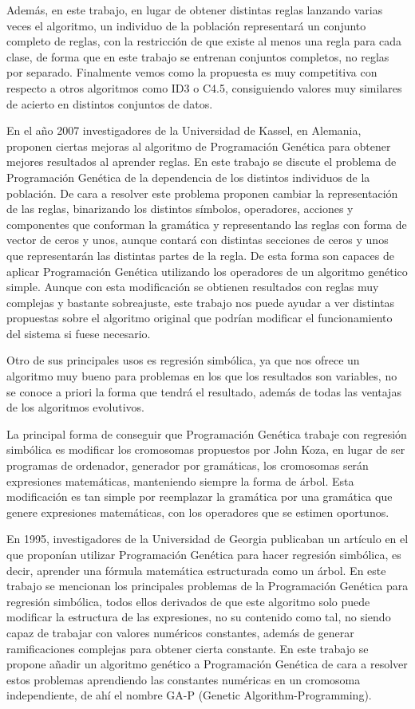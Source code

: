 Además, en este trabajo, en lugar de obtener distintas reglas lanzando varias veces el algoritmo, un individuo de la población representará un conjunto completo de reglas, con la restricción de que existe al menos una regla para cada clase, de forma que en este trabajo se entrenan conjuntos completos, no reglas por separado. Finalmente vemos como la propuesta es muy competitiva con respecto a otros algoritmos como ID3 o C4.5, consiguiendo valores muy similares de acierto en distintos conjuntos de datos.

En el año 2007 investigadores de la Universidad de Kassel, en Alemania, proponen \cite{mejorasPGreglas} ciertas mejoras al algoritmo de Programación Genética para obtener mejores resultados al aprender reglas. En este trabajo se discute el problema de Programación Genética de la dependencia de los distintos individuos de la población. De cara a resolver este problema proponen cambiar la representación de las reglas, binarizando los distintos símbolos, operadores, acciones y componentes que conforman la gramática y representando las reglas con forma de vector de ceros y unos, aunque contará con distintas secciones de ceros y unos que representarán las distintas partes de la regla. De esta forma son capaces de aplicar Programación Genética utilizando los operadores de un algoritmo genético simple. Aunque con esta modificación se obtienen resultados con reglas muy complejas y bastante sobreajuste, este trabajo nos puede ayudar a ver distintas propuestas sobre el algoritmo original que podrían modificar el funcionamiento del sistema si fuese necesario.

Otro de sus principales usos es regresión simbólica, ya que nos ofrece un algoritmo muy bueno para problemas en los que los resultados son variables, no se conoce a priori la forma que tendrá el resultado, además de todas las ventajas de los algoritmos evolutivos.

La principal forma de conseguir que Programación Genética trabaje con regresión simbólica es modificar los cromosomas propuestos por John Koza, en lugar de ser programas de ordenador, generador por gramáticas, los cromosomas serán expresiones matemáticas, manteniendo siempre la forma de árbol. Esta modificación es tan simple por reemplazar la gramática por una gramática que genere expresiones matemáticas, con los operadores que se estimen oportunos.

En 1995, investigadores de la Universidad de Georgia publicaban un artículo \cite{primerGAP} en el que proponían utilizar Programación Genética para hacer regresión simbólica, es decir, aprender una fórmula matemática estructurada como un árbol. En este trabajo se mencionan los principales problemas de la Programación Genética para regresión simbólica, todos ellos derivados de que este algoritmo solo puede modificar la estructura de las expresiones, no su contenido como tal, no siendo capaz de trabajar con valores numéricos constantes, además de generar ramificaciones complejas para obtener cierta constante. En este trabajo se propone añadir un algoritmo genético a Programación Genética de cara a resolver estos problemas aprendiendo las constantes numéricas en un cromosoma independiente, de ahí el nombre GA-P (Genetic Algorithm-Programming).

